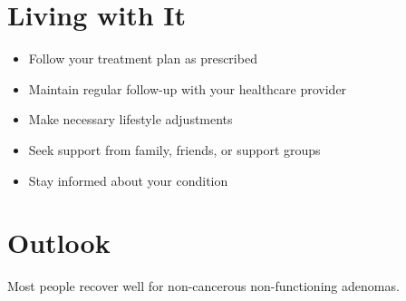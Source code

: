 \section{Living with It}
\begin{itemize}[noitemsep]
  \item Follow your treatment plan as prescribed
  \item Maintain regular follow-up with your healthcare provider
  \item Make necessary lifestyle adjustments
  \item Seek support from family, friends, or support groups
  \item Stay informed about your condition
\end{itemize}
\section{Outlook}
Most people recover well for non-cancerous non-functioning adenomas.
